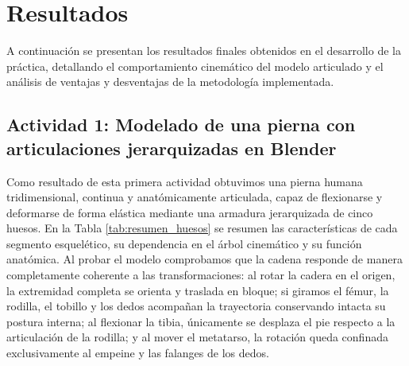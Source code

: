 
\section{Resultados}

A continuación se presentan los resultados finales obtenidos en el desarrollo de la práctica, detallando el comportamiento cinemático del modelo articulado y el análisis de ventajas y desventajas de la metodología implementada.

\subsection{Actividad 1: Modelado de una pierna con articulaciones jerarquizadas en Blender}

Como resultado de esta primera actividad obtuvimos una pierna humana tridimensional, continua y anatómicamente articulada, capaz de flexionarse y deformarse de forma elástica mediante una armadura jerarquizada de cinco huesos. En la Tabla \ref{tab:resumen_huesos} se resumen las características de cada segmento esquelético, su dependencia en el árbol cinemático y su función anatómica. Al probar el modelo comprobamos que la cadena responde de manera completamente coherente a las transformaciones: al rotar la cadera en el origen, la extremidad completa se orienta y traslada en bloque; si giramos el fémur, la rodilla, el tobillo y los dedos acompañan la trayectoria conservando intacta su postura interna; al flexionar la tibia, únicamente se desplaza el pie respecto a la articulación de la rodilla; y al mover el metatarso, la rotación queda confinada exclusivamente al empeine y las falanges de los dedos.

